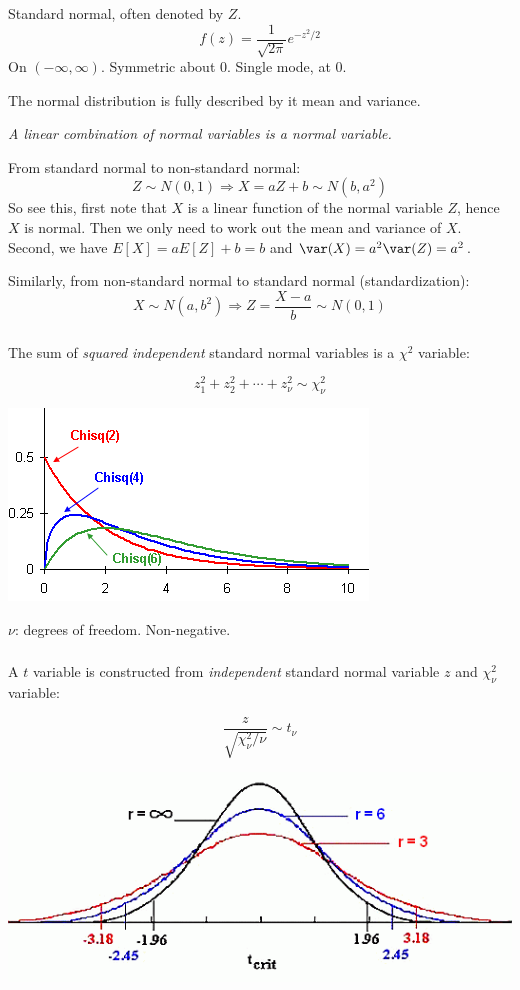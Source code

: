 \documentclass[12pt]{article}
\begin{document}
Standard normal, often denoted by $Z$.
\[
f(z) = \frac{1}{\sqrt{2\pi}} e^{-z^2/2}
\]
On $(-\infty, \infty)$. Symmetric about 0.
Single mode, at 0.

The normal distribution is fully described by it mean and variance.

\emph{A linear combination of normal variables is a normal variable.}

From standard normal to non-standard normal:
\[ Z \sim N(0,1) \Rightarrow X = aZ + b \sim N(b, a^2) \]
So see this,
first note that $X$ is a linear function of the normal variable $Z$,
hence $X$ is normal.
Then we only need to work out the mean and variance of $X$.
Second, we have
$E[X] = aE[Z] + b = b$ and
$\var(X) = a^2\var(Z) = a^2$.

Similarly,
from non-standard normal to standard normal (standardization):
\[ X \sim N(a, b^2) \Rightarrow Z = \frac{X - a}{b} \sim N(0,1) \]


\subsubsection{}

The sum of
\emph{squared} \emph{independent} standard normal variables
is a $\chi^2$ variable:

\parbox{.45\textwidth}{%
\[
z_1^2 + z_2^2 +\dotsb+z^2_\nu \sim \chi^2_\nu
\]
}\parbox{.54\textwidth}{%
\includegraphics[width=.54\textwidth]{fig_chi2.png}
}

$\nu$: degrees of freedom. Non-negative.

\subsubsection{}

A $t$ variable is constructed from
\emph{independent} standard normal variable $z$
and $\chi^2_\nu$ variable:

\parbox{.40\textwidth}{%
\[
\frac{z}{\sqrt{\chi^2_{\nu} / \nu}} \sim t_\nu
\]%
}\parbox{.59\textwidth}{%
\includegraphics[width=.58\textwidth]{fig_t.png}
}
\end{document}
